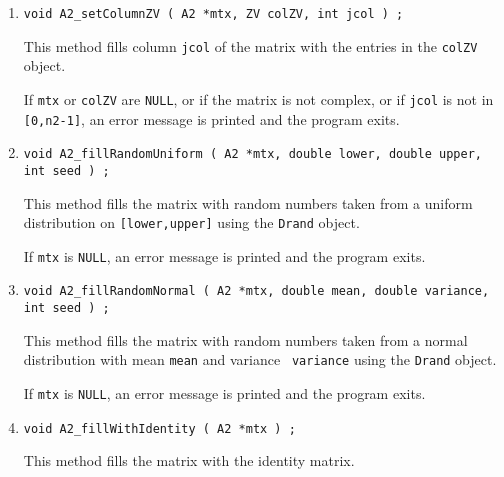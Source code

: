\begin{enumerate}
or if the matrix is not complex,
or if {\tt jcol} is not in {\tt [0,n2-1]},
an error message is printed and the program exits.
\item
\begin{verbatim}
void A2_setColumnZV ( A2 *mtx, ZV colZV, int jcol ) ;
\end{verbatim}
This method fills column {\tt jcol} of the matrix with
the entries in the {\tt colZV} object.
\par {}
If {\tt mtx} or {\tt colZV} are {\tt NULL},
or if the matrix is not complex,
or if {\tt jcol} is not in {\tt [0,n2-1]},
an error message is printed and the program exits.
\item
\begin{verbatim}
void A2_fillRandomUniform ( A2 *mtx, double lower, double upper, int seed ) ;
\end{verbatim}
This method fills the matrix with random numbers taken from a
uniform distribution on {\tt [lower,upper]} using the {\tt Drand}
object.
\par {}
If {\tt mtx} is {\tt NULL}, 
an error message is printed and the program exits.
\item
\begin{verbatim}
void A2_fillRandomNormal ( A2 *mtx, double mean, double variance, int seed ) ;
\end{verbatim}
This method fills the matrix with random numbers taken from a
normal distribution with mean {\tt mean} and variance {\tt
variance} using the {\tt Drand} object.
\par {}
If {\tt mtx} is {\tt NULL}, 
an error message is printed and the program exits.
\item
\begin{verbatim}
void A2_fillWithIdentity ( A2 *mtx ) ;
\end{verbatim}
This method fills the matrix with the identity matrix.
\par {}

\end{enumerate}
